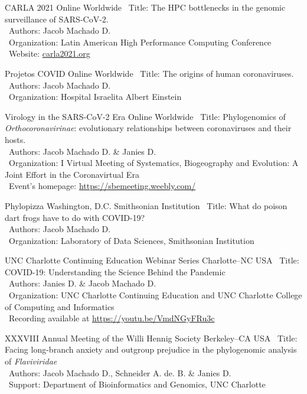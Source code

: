 \documentclass[11pt, letterpaper, sans]{moderncv}
\begin{document}
\cventry{---}
	{CARLA 2021}
	{Online}
	{Worldwide}
	{}
	{
		\textbullet~Title: The HPC bottlenecks in the genomic surveillance of SARS-CoV-2.\\
		\textbullet~Authors: Jacob Machado D.\\
		\textbullet~Organization: Latin American High Performance Computing Conference\\
		\textbullet~Website: \url{carla2021.org}\\
	}

\cventry{---}
	{Projetos COVID}
	{Online}
	{Worldwide}
	{}
	{
		\textbullet~Title: The origins of human coronaviruses.\\
		\textbullet~Authors: Jacob Machado D.\\
		\textbullet~Organization: Hospital Israelita Albert Einstein\\
	}

	{Virology in the SARS-CoV-2 Era}
	{Online}
	{Worldwide}
	{}
	{
		\textbullet~Title: Phylogenomics of \textit{Orthocoronavirinae}: evolutionary relationships between coronaviruses and their hosts.\\
		\textbullet~Authors: Jacob Machado D. \& Janies D.\\
		\textbullet~Organization: I Virtual Meeting of Systematics, Biogeography and Evolution: A Joint Effort in the Coronavirtual Era\\
		\textbullet~Event's homepage: \url{https://sbemeeting.weebly.com/}
	}

\cventry{---}
	{Phylopizza}
	{Washington, D.C.}
	{Smithsonian Institution}
	{}
	{
		\textbullet~Title: What do poison dart frogs have to do with COVID-19?\\
		\textbullet~Authors: Jacob Machado D.\\
		\textbullet~Organization: Laboratory of Data Sciences, Smithsonian Institution\\
	}

\cventry{---}
	{UNC Charlotte Continuing Education Webinar Series}
	{Charlotte--NC}
	{USA}
	{}
	{
		\textbullet~Title: COVID-19: Understanding the Science Behind the Pandemic\\
		\textbullet~Authors: Janies D. \& Jacob Machado D.\\
		\textbullet~Organization: UNC Charlotte Continuing Education and UNC Charlotte College of Computing and Informatics\\
		\textbullet~Recording available at \url{https://youtu.be/VmdNGyFRu3c}
	}

	{XXXVIII Annual Meeting of the Willi Hennig Society}
	{Berkeley--CA}
	{USA}
	{}
	{
		\textbullet~Title: Facing long-branch anxiety and outgroup prejudice in the phylogenomic analysis of \emph{Flaviviridae}\\
		\textbullet~Authors: Jacob Machado D., Schneider A. de. B. \& Janies D.\\
		\textbullet~Support: Department of Bioinformatics and Genomics,  UNC Charlotte
	}
\end{document}
